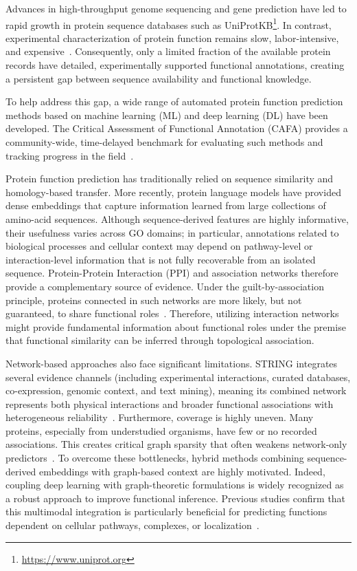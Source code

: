 \documentclass[Ingles]{ic-tese-v3}
\begin{document}
Advances in high-throughput genome sequencing and gene prediction have led to rapid growth in protein sequence databases such as UniProtKB\footnote{\url{https://www.uniprot.org}}. In contrast, experimental characterization of protein function remains slow, labor-intensive, and expensive~\cite{uniprot2025uniprot, dessimoz_cafa_2013}. Consequently, only a limited fraction of the available protein records have detailed, experimentally supported functional annotations, creating a persistent gap between sequence availability and functional knowledge.

To help address this gap, a wide range of automated protein function prediction methods based on machine learning (ML) and deep learning (DL) have been developed. The Critical Assessment of Functional Annotation (CAFA) provides a community-wide, time-delayed benchmark for evaluating such methods and tracking progress in the field~\cite{zhou_cafa_2019,radivojac2013large}.

Protein function prediction has traditionally relied on sequence similarity and homology-based transfer. More recently, protein language models have provided dense embeddings that capture information learned from large collections of amino-acid sequences. Although sequence-derived features are highly informative, their usefulness varies across GO domains; in particular, annotations related to biological processes and cellular context may depend on pathway-level or interaction-level information that is not fully recoverable from an isolated sequence. Protein-Protein Interaction (PPI) and association networks therefore provide a complementary source of evidence. Under the guilt-by-association principle, proteins connected in such networks are more likely, but not guaranteed, to share functional roles~\cite{vazquez_global_2003, koh_analyzing_2012, gillis2011impact}. Therefore, utilizing interaction networks might provide fundamental information about functional roles under the premise that functional similarity can be inferred through topological association.

Network-based approaches also face significant limitations. STRING integrates several evidence channels (including experimental interactions, curated databases, co-expression, genomic context, and text mining), meaning its combined network represents both physical interactions and broader functional associations with heterogeneous reliability~\cite{szklarczyk_string_2025, you_deepgraphgo_2021}. Furthermore, coverage is highly uneven. Many proteins, especially from understudied organisms, have few or no recorded associations. This creates critical graph sparsity that often weakens network-only predictors~\cite{deepnf}. To overcome these bottlenecks, hybrid methods combining sequence-derived embeddings with graph-based context are highly motivated. Indeed, coupling deep learning with graph-theoretic formulations is widely recognized as a robust approach to improve functional inference. Previous studies confirm that this multimodal integration is particularly beneficial for predicting functions dependent on cellular pathways, complexes, or localization~\cite{barot2021netquilt,gillis2011impact, boadu2025deep, lin2024comprehensive}.
\end{document}
